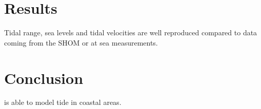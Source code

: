 \section{Results}
%
Tidal range, sea levels and tidal velocities are well reproduced compared to
data coming from the SHOM or at sea measurements.
%
\section{Conclusion}
%
 is able to model tide in coastal areas.
%
%
